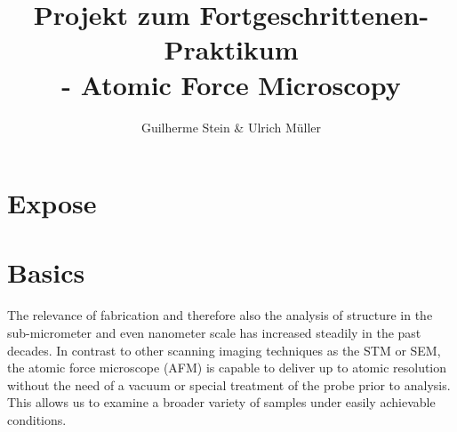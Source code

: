 \documentclass[paper=a4,fontsize=10pt,DIV=18,twocolumn,parskip=half]{scrartcl}
\numberwithin{equation}{section}    %
\begin{document}
\title{Projekt zum Fortgeschrittenen-Praktikum \\ - Atomic Force Microscopy}                  
\author{Guilherme Stein \& Ulrich Müller}         
\date{}                             %
\section{Expose}

\label{Expose}
\newpage

\section{Basics}
The relevance of fabrication and therefore also the analysis of structure in the 
sub-micrometer and even nanometer scale has increased steadily in the past 
decades. In contrast to other scanning imaging techniques as the STM or SEM, the 
atomic force microscope (AFM) is capable to deliver up to atomic resolution 
without the need of a vacuum or special treatment of the probe prior to 
analysis. This allows us to examine a broader variety of samples under easily 
achievable conditions.
\end{document}
